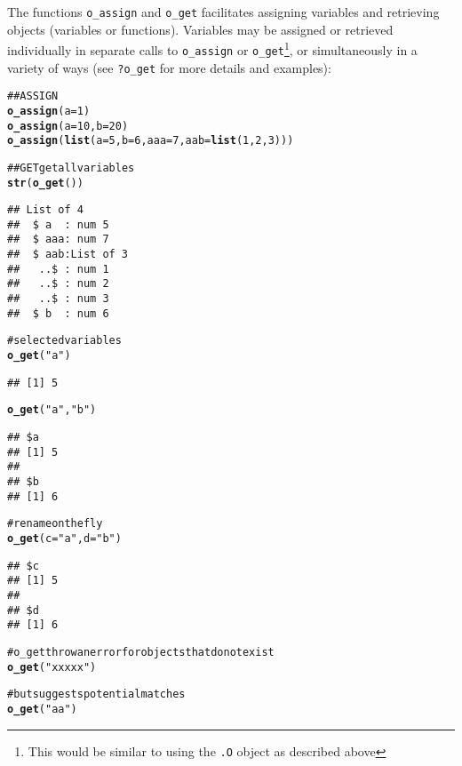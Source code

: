 \documentclass[english,10pt,a4paper]{article}\usepackage{graphicx, color}
\makeatletter
\newcommand{\hlfunctioncall}[1]{\textcolor[rgb]{0.501960784313725,0,0.329411764705882}{\textbf{#1}}}%
\newcommand{\hlstring}[1]{\textcolor[rgb]{0.6,0.6,1}{#1}}%
\newcommand{\hlcomment}[1]{\textcolor[rgb]{0.180392156862745,0.6,0.341176470588235}{#1}}%
\newenvironment{kframe}{%
 \def\at@end@of@kframe{}%
 \ifinner\ifhmode%
  \def\at@end@of@kframe{\end{minipage}}%
  \begin{minipage}{\columnwidth}%
 \fi\fi%
 \def\FrameCommand##1{\hskip\@totalleftmargin \hskip-\fboxsep
 \colorbox{shadecolor}{##1}\hskip-\fboxsep
     \hskip-\linewidth \hskip-\@totalleftmargin \hskip\columnwidth}%
 \MakeFramed {\advance\hsize-\width
   \@totalleftmargin\z@ \linewidth\hsize
   \@setminipage}}%
 {\par\unskip\endMakeFramed%
 \at@end@of@kframe}
\newenvironment{knitrout}{}{} %
\let\code=\texttt
\makeatother
\begin{document}
The functions \code{o\_assign} and \code{o\_get} facilitates assigning variables
and retrieving objects (variables or functions).
Variables may be assigned or retrieved individually in separate calls to
\code{o\_assign} or \code{o\_get}\footnote{This would be similar to using the
\code{.O} object as described above}, or simultaneously in a variety of ways
(see \code{?o\_get} for more details and examples):

\begin{knitrout}
\color{fgcolor}\begin{kframe}
\begin{alltt}
\hlcomment{## ASSIGN}
\hlfunctioncall{o_assign}(a = 1)
\hlfunctioncall{o_assign}(a = 10, b = 20)
\hlfunctioncall{o_assign}(\hlfunctioncall{list}(a = 5, b = 6, aaa = 7, aab = \hlfunctioncall{list}(1, 2, 3)))

\hlcomment{## GET get all variables}
\hlfunctioncall{str}(\hlfunctioncall{o_get}())
\end{alltt}
\begin{verbatim}
## List of 4
##  $ a  : num 5
##  $ aaa: num 7
##  $ aab:List of 3
##   ..$ : num 1
##   ..$ : num 2
##   ..$ : num 3
##  $ b  : num 6
\end{verbatim}
\begin{alltt}
\hlcomment{# selected variables}
\hlfunctioncall{o_get}(\hlstring{"a"})
\end{alltt}
\begin{verbatim}
## [1] 5
\end{verbatim}
\begin{alltt}
\hlfunctioncall{o_get}(\hlstring{"a"}, \hlstring{"b"})
\end{alltt}
\begin{verbatim}
## $a
## [1] 5
## 
## $b
## [1] 6
\end{verbatim}
\begin{alltt}
\hlcomment{# rename on the fly}
\hlfunctioncall{o_get}(c = \hlstring{"a"}, d = \hlstring{"b"})
\end{alltt}
\begin{verbatim}
## $c
## [1] 5
## 
## $d
## [1] 6
\end{verbatim}
\begin{alltt}
\hlcomment{# o_get throw an error for objects that do not exist}
\hlfunctioncall{o_get}(\hlstring{"xxxxx"})
\end{alltt}


{\ttfamily\noindent\bfseries\color{errorcolor}{\#\# Error: RcppOctave::o\_get - Could not find an Octave object named 'xxxxx'.}}\begin{alltt}
\hlcomment{# but suggests potential matches}
\hlfunctioncall{o_get}(\hlstring{"aa"})
\end{alltt}



\end{kframe}
\end{knitrout}
\end{document}
